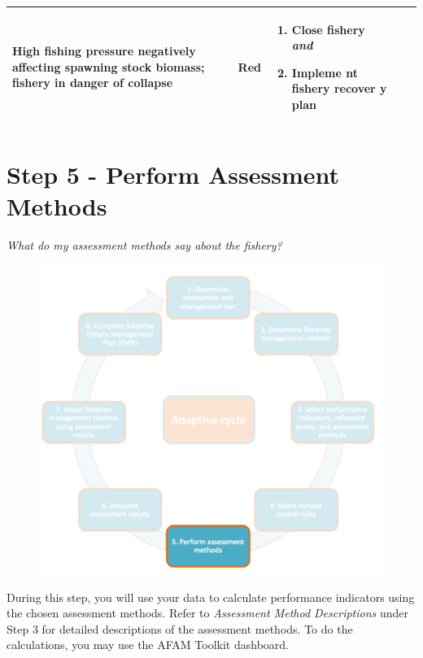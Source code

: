 \documentclass[]{book}
\begin{document}
\begin{longtable}[]{@{}lllll@{}}
\begin{minipage}[t]{0.19\columnwidth}
High fishing pressure negatively affecting spawning stock biomass;
fishery in danger of collapse\strut
\end{minipage} & \begin{minipage}[t]{0.19\columnwidth}\raggedright\strut
Red\strut
\end{minipage} & \begin{minipage}[t]{0.19\columnwidth}\raggedright\strut
\begin{enumerate}
\def\labelenumi{\arabic{enumi}.}
\item
  Close fishery \textbf{\emph{and} }
\item
  Impleme nt fishery recover y plan
\end{enumerate}\strut
\end{minipage}\tabularnewline
\bottomrule
\end{longtable}

\chapter{Step 5 - Perform Assessment Methods}\label{Step5}

\emph{What do my assessment methods say about the fishery?}

\begin{figure}
\centering
\includegraphics{myMediaFolder/media/Step5.png}
\caption{}
\end{figure}

During this step, you will use your data to calculate performance
indicators using the chosen assessment methods. Refer to
\emph{Assessment Method Descriptions} under Step 3 for detailed
descriptions of the assessment methods. To do the calculations, you may
use the AFAM Toolkit dashboard.
\end{document}
